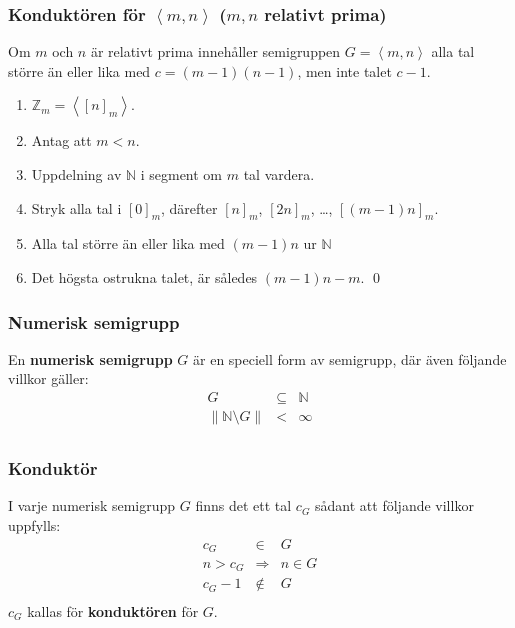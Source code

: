 \documentclass{beamer}
\begin{document}
\begin{frame}
	\frametitle{Konduktören för $\left<m,n\right>$ ($m, n$ relativt prima)}
\begin{Theorem}
	Om $m$ och $n$ är relativt prima innehåller semigruppen $G = \left<m, n\right>$ alla tal större än eller lika med $c = (m - 1)(n - 1)$, men inte talet $c - 1$.
\end{Theorem}

\begin{enumerate}
	\item<3-> $\mathbb{Z}_m = \left<[n]_m\right>$.
	\item<4-> Antag att $m<n$.
	\item<5-> Uppdelning av $\mathbb{N}$ i segment om $m$ tal vardera.
	\item<6-> Stryk alla tal i $[0]_m$, därefter $[n]_m$, $[2n]_m$, \ldots, $\left[(m-1)n\right]_m$.
	\item<7-> Alla tal större än eller lika med $(m-1)n$ ur $\mathbb{N}$
	\item<8-> Det högsta ostrukna talet, är således $(m - 1)n - m$. \qed
\end{enumerate}
\end{frame}

\begin{frame}
	\frametitle{Numerisk semigrupp}
\begin{Definition}
	En \textbf{numerisk semigrupp} $G$ är en speciell form av semigrupp, där även följande villkor gäller:
	\[
	\begin{array}{rcl}
	G & \subseteq & \mathbb{N} \\
	\left\| \mathbb{N} \setminus G \right\| & < & \infty \\
	\end{array}\]
\end{Definition}

\end{frame}

\begin{frame}
	\frametitle{Konduktör}
\begin{Definition}
	I varje numerisk semigrupp $G$ finns det ett tal $c_G$ sådant att följande villkor uppfylls:
	\[\begin{array}{rcl}
	c_G & \in & G \\
	n > c_G & \Longrightarrow & n \in G \\
	c_G - 1 & \notin & G \\
	\end{array}\]
	$c_G$ kallas för \textbf{konduktören} för $G$.
\end{Definition}
\end{frame}
\end{document}
